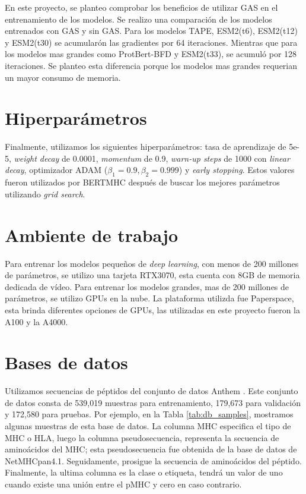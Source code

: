 En este proyecto, se planteo  comprobar los beneficios de utilizar GAS en el entrenamiento de los modelos. Se realizo una comparación de los modelos entrenados con GAS y sin GAS. Para los modelos TAPE, ESM2(t6), ESM2(t12) y ESM2(t30) se acumularón las gradientes por 64 iteraciones. Mientras que para los modelos mas grandes como ProtBert-BFD y ESM2(t33), se acumuló por 128 iteraciones. Se planteo esta diferencia porque los modelos mas grandes requerian un mayor consumo de memoria.


\section{Hiperparámetros}\label{sec:hyperparam}
Finalmente, utilizamos los siguientes hiperparámetros: tasa de aprendizaje de 5e-5, \textit{weight decay} de 0.0001, \textit{momentum} de 0.9, \textit{warn-up steps} de 1000 con \textit{linear decay}, optimizador ADAM ($\beta_1 = 0.9, \beta_2=0.999$) y \textit{early stopping}. Estos valores fueron utilizados por BERTMHC \citep{cheng2021bertmhc} después de buscar los mejores parámetros utilizando \textit{grid search}.

\section{Ambiente de trabajo}

Para entrenar los modelos pequeños de \textit{deep learning}, con menos de 200 millones de parámetros, se utilizo una tarjeta RTX3070, esta cuenta con 8GB de memoria dedicada de vídeo. Para entrenar los modelos grandes, mas de 200 millones de parámetros, se utilizo GPUs en la nube. La plataforma utilizda fue Paperspace, esta brinda diferentes opciones de GPUs, las utilizadas en este proyecto fueron la A100 y la A4000.

\section{Bases de datos}
Utilizamos secuencias de péptidos del conjunto de datos Anthem \citep{mei2021anthem}. Este conjunto de datos consta de 539,019 muestras para entrenamiento, 179,673 para validación y 172,580 para pruebas. Por ejemplo, en la Tabla \ref{tab:db_samples}, mostramos algunas muestras de esta base de datos. La columna MHC especifica el tipo de MHC o HLA, luego la columna pseudosecuencia, representa la secuencia de aminoácidos del MHC; esta pseudosecuencia fue obtenida de la base de datos de NetMHCpan4.1. Seguidamente, prosigue la secuencia de aminoácidos del péptido. Finalmente, la ultima columna es la clase o etiqueta, tendrá un valor de uno cuando existe una unión entre el pMHC y cero en caso contrario.


